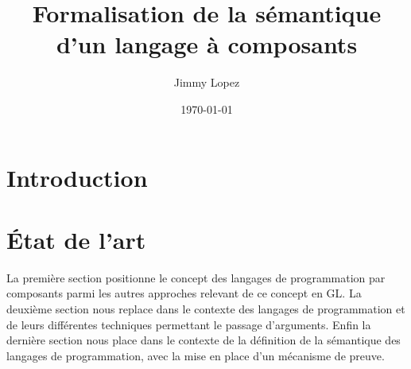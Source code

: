 \documentclass[utf8]{stageM2R} %
\author{Jimmy Lopez}
\title{Formalisation de la sémantique d’un langage à composants}
\date{\today}
\begin{document}
   
\frontmatter  %
\maketitle    %
\cleardoublepage   
\tableofcontents %
\mainmatter  %



\chapter{Introduction}

  
  
\chapter{État de l'art}

La première section positionne le concept des langages de programmation par composants parmi les autres approches relevant de ce concept en GL. La deuxième section nous replace dans le contexte des langages de programmation et de leurs différentes techniques permettant le passage d'arguments. Enfin la dernière section nous place dans le contexte de la définition de la sémantique des langages de programmation, avec la mise en place d'un mécanisme de preuve. 
\end{document}
